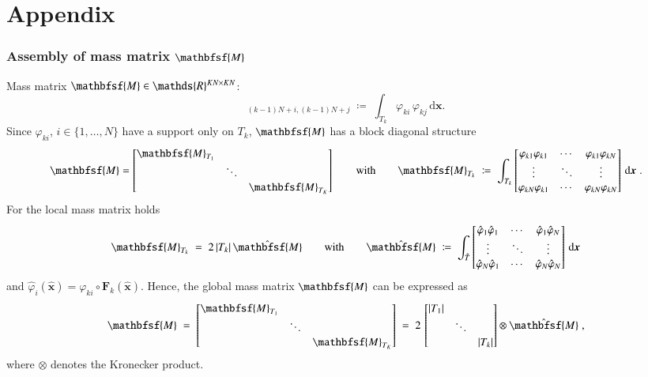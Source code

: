 \documentclass[final,12pt]{beamer}
\newcommand{\IR}{\ensuremath\mathds{R}}
\newcommand*{\vphi}{\varphi}                                     %
\renewcommand*{\vec}[1]{{\boldsymbol{#1}}}                       %
\newcommand*{\vecc}[1]{\mathbfsf{#1}}                            %
\newcommand*{\dd}{\mathrm{d}}                                    %
\begin{document}
\appendix
\section*{Appendix}

\begin{frame}
\frametitle{Assembly of mass matrix \(\vecc{M}\)}
  Mass matrix $\vecc{M}\in\IR^{KN\times KN}$:
  \begin{equation*}
    [\vecc{M}]_{(k-1)N+i,(k-1)N+j} \;\coloneqq\; \int_{T_k} \vphi_{ki} \, \vphi_{kj} \, \dd\vec{x}.
  \end{equation*}
  Since $\vphi_{ki}$, $i\in\{1,\ldots,N\}$ have a support only on $T_k$, $\vecc{M}$ has a block diagonal structure
  \begin{equation*}
    \vecc{M} = \begin{bmatrix} \vecc{M}_{T_1} & & \\ & \ddots & \\ & & \vecc{M}_{T_K} \end{bmatrix}
    \qquad\text{with}\qquad
    \vecc{M}_{T_k} \;\coloneqq\; \int_{T_k} \begin{bmatrix}
    \vphi_{k1}\vphi_{k1} & \cdots & \vphi_{k1}\vphi_{kN} \\
    \vdots               & \ddots & \vdots               \\
    \vphi_{kN}\vphi_{k1} & \cdots & \vphi_{kN}\vphi_{kN}
    \end{bmatrix}\,\dd\vec{x}\;.
  \end{equation*}
  For the local mass matrix holds
  \begin{equation*}
    \vecc{M}_{T_k} \;=\; 2\,|T_k|\,\hat{\vecc{M}}
    \qquad\text{with}\qquad
    \hat{\vecc{M}} \;\coloneqq\; \int_{\hat{T}} \begin{bmatrix}
    \hat{\vphi}_{1}\hat{\vphi}_{1} & \cdots & \hat{\vphi}_{1}\hat{\vphi}_{N} \\
    \vdots                         & \ddots & \vdots                         \\
    \hat{\vphi}_{N}\hat{\vphi}_{1} & \cdots & \hat{\vphi}_{N}\hat{\vphi}_{N}
    \end{bmatrix}\,\dd\vec{x}
  \end{equation*}
  and $\hat{\vphi}_i(\hat{\vec{x}}) = \vphi_{ki} \circ \vec{F}_k (\hat{\vec{x}})$.
  Hence, the global mass matrix $\vecc{M}$ can be expressed as
  \begin{equation*}
    \vecc{M} \;=\;
    \begin{bmatrix} \vecc{M}_{T_1} & & \\ & \ddots & \\ & & \vecc{M}_{T_K} \end{bmatrix}
    \; = \; 2 \, \begin{bmatrix} |T_1| & & \\ & \ddots & \\ & & |T_k| \end{bmatrix}
    \otimes \hat{\vecc{M}}\;,
  \end{equation*}
  where $\otimes$ denotes the Kronecker product.
\end{frame}
\end{document}
